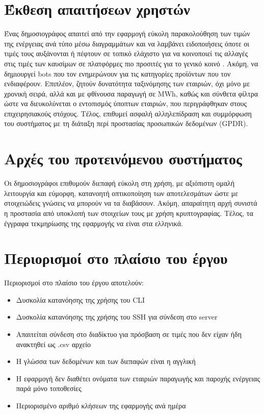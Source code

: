 \documentclass[a4paper,12pt, oneside]{article}
\begin{document}
\section{Έκθεση απαιτήσεων χρηστών}
Ένας δημοσιογράφος απαιτεί από την εφαρμογή εύκολη παρακολούθηση των τιμών της ενέργειας ανά τύπο μέσω διαγραμμάτων και να λαμβάνει ειδοποιήσεις όποτε οι τιμές τους αυξάνονται ή πέφτουν σε τοπικό ελάχιστο για να κοινοποιεί τις αλλαγές  στις τιμές των καυσίμων σε πλατφόρμες πιο προσιτές για το γενικό κοινό . Ακόμη, να  δημιουργεί \textlatin{bots} που τον ενημερώνουν για τις κατηγορίες προϊόντων που τον ενδιαφέρουν. Επιπλέον, ζητούν δυνατότητα ταξινόμησης των εταιριών, όχι μόνο με χρονική σειρά, αλλά και με φθίνουσα παραγωγή σε \textlatin{MWh}, καθώς και σύνθετα φίλτρα ώστε να διευκολύνεται ο εντοπισμός ύποπτων εταιριών, που περιγράφθηκαν στους επιχειρησιακούς στόχους. Τέλος, επιθυμεί ασφαλή  αλληλεπίδραση και συμμόρφωση του συστήματος με τη διάταξη περί προστασίας προσωπικών δεδομένων \textlatin{(GPDR)}.


\section{Αρχές του προτεινόμενου συστήματος}
Οι δημοσιογράφοι επιθυμούν διεπαφή εύκολη στη χρήση, με αξιόπιστη ομαλή λειτουργία  και εύμορφη, κατανοητή οπτικοποίηση των αποτελεσμάτων ώστε με στοιχειώδεις γνώσεις να μπορούν να τα διαβάσουν.  Ακόμη, απαραίτητη αρχή συνιστά η προστασία από υποκλοπή των στοιχείων τους με χρήση κρυπτογραφίας. Τέλος, τα έγγραφα τεκμηρίωσης της εφαρμογής να είναι στα ελληνικά.


\section{Περιορισμοί στο πλαίσιο του έργου}
Περιορισμοί στο πλαίσιο του έργου αποτελούν:
\begin{itemize}
  \item Δυσκολία κατανόησης της χρήσης του \textlatin{CLI}
  \item Δυσκολία κατανόησης της χρήσης του \textlatin{SSH} για σύνδεση στο \textlatin{server}
  \item Απαιτείται σύνδεση στο διαδίκτυο για πρόσβαση σε τιμές που δεν είχαν ήδη ανακτηθεί ως \textlatin{.csv} αρχείο
  \item Η γλώσσα των δεδομένων και των διεπαφών είναι η αγγλική
  \item Η εφαρμογή δεν διαθέτει ονόματα των εταιριών παραγωγής και παροχής ενέργειας παρά μόνο τοποθεσίες      
  \item Περιορισμένο αριθμό κλήσεων της εφαρμογής ανά ημέρα
\end{itemize}
\newpage
\end{document}
